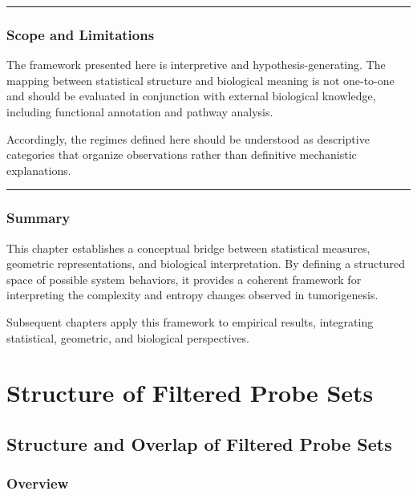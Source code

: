 \documentclass[
  letterpaper,
  DIV=11,
  numbers=noendperiod,
  openany,
  oneside]{scrreprt}
\begin{document}
\begin{center}\rule{0.5\linewidth}{0.5pt}\end{center}

\section{Scope and Limitations}\label{scope-and-limitations}

The framework presented here is interpretive and hypothesis-generating.
The mapping between statistical structure and biological meaning is not
one-to-one and should be evaluated in conjunction with external
biological knowledge, including functional annotation and pathway
analysis.

Accordingly, the regimes defined here should be understood as
descriptive categories that organize observations rather than definitive
mechanistic explanations.

\begin{center}\rule{0.5\linewidth}{0.5pt}\end{center}

\section{Summary}\label{summary-2}

This chapter establishes a conceptual bridge between statistical
measures, geometric representations, and biological interpretation. By
defining a structured space of possible system behaviors, it provides a
coherent framework for interpreting the complexity and entropy changes
observed in tumorigenesis.

Subsequent chapters apply this framework to empirical results,
integrating statistical, geometric, and biological perspectives.

\part{Structure of Filtered Probe Sets}

\chapter{Structure and Overlap of Filtered Probe
Sets}\label{structure-and-overlap-of-filtered-probe-sets}

\section{Overview}\label{overview-7}
\end{document}

